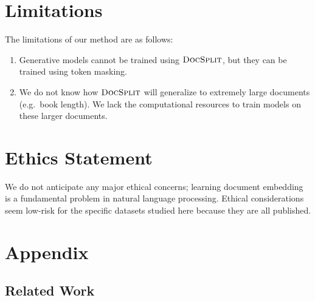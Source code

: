 \documentclass[11pt]{article}
\newcommand{\our}{\mbox{\textsc{DocSplit}}}
\begin{document}
\section*{Limitations}
The limitations of our method are as follows:
\begin{enumerate}[nosep,leftmargin=*]
    \item Generative models cannot be trained using $\our$, but they can be trained using token masking.
    \item We do not know how $\our$ will generalize to extremely large documents (e.g.\ book length).
        We lack the computational resources to train models on these larger documents.
\end{enumerate}

\section*{Ethics Statement}
We do not anticipate any major ethical concerns; learning document embedding is a fundamental problem in natural language processing. Ethical considerations seem low-risk for the specific datasets studied here because they are all published.





\clearpage
\appendix
\section{Appendix}

\subsection{Related Work}
\end{document}

